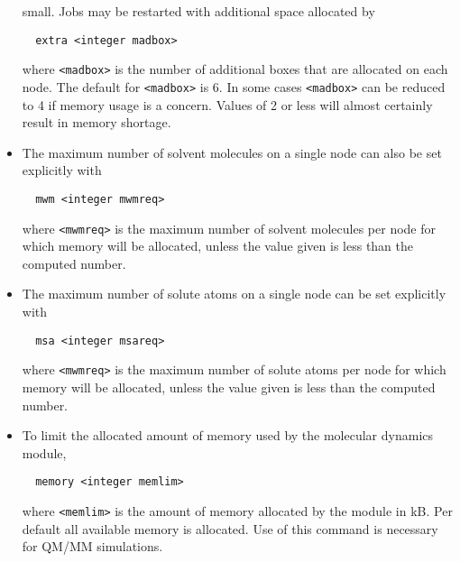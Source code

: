 \begin{itemize}
small. Jobs may be restarted with additional space allocated by
\begin{verbatim}
  extra <integer madbox>
\end{verbatim}
where \verb+<madbox>+ is the number of additional boxes that are allocated
on each node. The default for \verb+<madbox>+ is 6. 
In some cases \verb+<madbox>+ can be reduced to 4 if memory usage is a
concern. Values of 2 or less will almost certainly result in memory 
shortage.
\item
The maximum number of solvent molecules on a single node can also be
set explicitly with
\begin{verbatim}
  mwm <integer mwmreq>
\end{verbatim}
where \verb+<mwmreq>+ is the maximum number of solvent molecules per
node for which memory will be allocated, unless the value given is 
less than the computed number.
\item
The maximum number of solute atoms on a single node can be set
explicitly with
\begin{verbatim}
  msa <integer msareq>
\end{verbatim}
where \verb+<mwmreq>+ is the maximum number of solute atoms per
node for which memory will be allocated, unless the value given is
less than the computed number.
\item
To limit the allocated amount of memory used by the molecular dynamics
module,
\begin{verbatim}
  memory <integer memlim>
\end{verbatim}
where \verb+<memlim>+ is the amount of memory allocated by the module in
kB. Per default all available memory is allocated. Use of this command
is necessary for QM/MM simulations.
\end{itemize}






